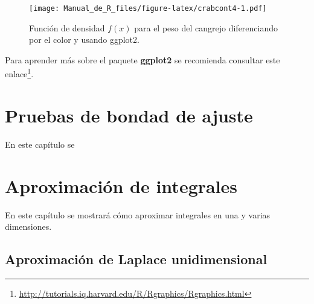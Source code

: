 \documentclass[10pt,]{krantz}
\makeatletter
\newenvironment{Shaded}{\begin{snugshade}}{\end{snugshade}}
\newcommand{\KeywordTok}[1]{\textcolor[rgb]{0.13,0.29,0.53}{\textbf{{#1}}}}
\newcommand{\DataTypeTok}[1]{\textcolor[rgb]{0.13,0.29,0.53}{{#1}}}
\newcommand{\DecValTok}[1]{\textcolor[rgb]{0.00,0.00,0.81}{{#1}}}
\newcommand{\FloatTok}[1]{\textcolor[rgb]{0.00,0.00,0.81}{{#1}}}
\newcommand{\StringTok}[1]{\textcolor[rgb]{0.31,0.60,0.02}{{#1}}}
\newcommand{\CommentTok}[1]{\textcolor[rgb]{0.56,0.35,0.01}{\textit{{#1}}}}
\newcommand{\NormalTok}[1]{{#1}}
\renewcommand{\href}[2]{#2\footnote{\url{#1}}}
\newenvironment{kframe}{%
\medskip{}
\setlength{\fboxsep}{.8em}
 \def\at@end@of@kframe{}%
 \ifinner\ifhmode%
  \def\at@end@of@kframe{\end{minipage}}%
  \begin{minipage}{\columnwidth}%
 \fi\fi%
 \def\FrameCommand##1{\hskip\@totalleftmargin \hskip-\fboxsep
 \colorbox{shadecolor}{##1}\hskip-\fboxsep
     \hskip-\linewidth \hskip-\@totalleftmargin \hskip\columnwidth}%
 \MakeFramed {\advance\hsize-\width
   \@totalleftmargin\z@ \linewidth\hsize
   \@setminipage}}%
 {\par\unskip\endMakeFramed%
 \at@end@of@kframe}
\renewenvironment{Shaded}{\begin{kframe}}{\end{kframe}}
\makeatother
\begin{document}
\begin{Shaded}
\end{Shaded}

\begin{figure}[htbp]
\centering
\texttt{[image: Manual\_de\_R\_files/figure-latex/crabcont4-1.pdf]}
\caption{\label{fig:crabcont4}Función de densidad \(f(x)\) para el peso del
cangrejo diferenciando por el color y usando ggplot2.}
\end{figure}

Para aprender más sobre el paquete \textbf{ggplot2} se recomienda
consultar este
\href{http://tutorials.iq.harvard.edu/R/Rgraphics/Rgraphics.html}{enlace}.

\chapter{Pruebas de bondad de ajuste}\label{pruebas-de-bondad-de-ajuste}

En este capítulo se

\chapter{Aproximación de integrales}\label{aproximacion-de-integrales}

En este capítulo se mostrará cómo aproximar integrales en una y varias
dimensiones.

\section{Aproximación de Laplace
unidimensional}\label{aproximacion-de-laplace-unidimensional}
\end{document}
